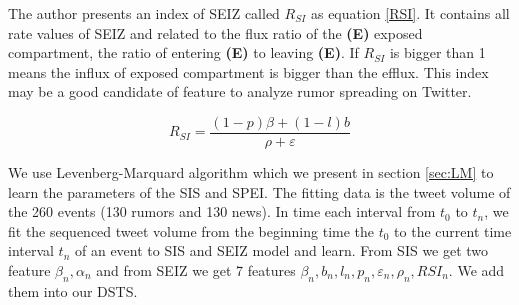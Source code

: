 \begin{table}[!h]
 \centering
{}
\caption{Parameters of SEIZ}
\label{tab:SEIZ_Para}
\end{table}
The author presents an index of SEIZ called $R_{SI}$ as equation \ref{RSI}. It contains all rate values of SEIZ and related to the flux ratio of the \textbf{(E)} exposed compartment, the ratio of entering \textbf{(E)} to leaving \textbf{(E)}. If $R_{SI}$ is bigger than 1 means the influx of exposed compartment is bigger than the efflux. This index may be a good candidate of feature to analyze rumor spreading on Twitter.


\begin{equation}
\label{RSI}
R_{SI}=\frac{(1-p)\beta+(1-l)b}{\rho+\varepsilon}  
\end{equation}

We use Levenberg-Marquard algorithm which we present in section \ref{sec:LM} to learn the parameters of the SIS and SPEI. The fitting data is the tweet volume of the 260 events  (130 rumors and 130 news). 
 In time each interval from $t_0$ to $t_n$, we fit the sequenced  tweet volume from the beginning time the $t_0$ to the current time interval $t_n$ of an event to SIS and SEIZ model and learn. From SIS we get two feature $\beta_{n},\alpha_{n}$ and from SEIZ we get 7 features $\beta_{n},b_{n},l_{n},p_{n},\varepsilon_{n},\rho_{n},RSI_{n}$. We add them into our DSTS.
 
